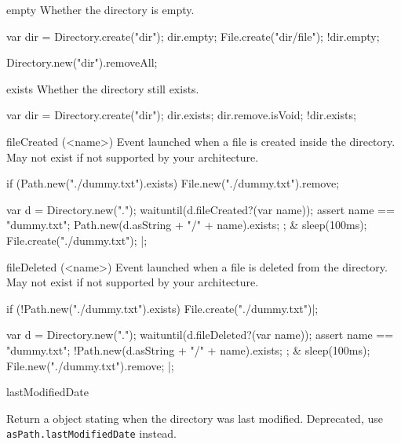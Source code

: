 \begin{urbiscriptapi}
\item[empty]
  Whether the directory is empty.
\begin{urbiassert}
var dir = Directory.create("dir");
dir.empty;
File.create("dir/file");
!dir.empty;
\end{urbiassert}
\begin{urbicomment}
Directory.new("dir").removeAll;
\end{urbicomment}


\item[exists]
  Whether the directory still exists.
\begin{urbiassert}
var dir = Directory.create("dir");
dir.exists;
dir.remove.isVoid;
!dir.exists;
\end{urbiassert}


\item[fileCreated](<name>)%
  Event launched when a file is created inside the directory.
  May not exist if not supported by your architecture.

\begin{urbiscript}[firstnumber=1]
if (Path.new("./dummy.txt").exists)
  File.new("./dummy.txt").remove;

  {
    var d = Directory.new(".");
    waituntil(d.fileCreated?(var name));
    assert
    {
      name == "dummy.txt";
      Path.new(d.asString + "/" + name).exists;
    };
  }
&
  {
    sleep(100ms);
    File.create("./dummy.txt");
  }|;
\end{urbiscript}


\item[fileDeleted](<name>)%
  Event launched when a file is deleted from the directory.  May not exist
  if not supported by your architecture.
\begin{urbiscript}[firstnumber=1]
if (!Path.new("./dummy.txt").exists)
  File.create("./dummy.txt")|;

  {
    var d = Directory.new(".");
    waituntil(d.fileDeleted?(var name));
    assert
    {
      name == "dummy.txt";
      !Path.new(d.asString + "/" + name).exists;
    };
  }
&
  {
    sleep(100ms);
    File.new("./dummy.txt").remove;
  }|;
\end{urbiscript}


\item[lastModifiedDate]
  \experimental{}

  Return a  object stating when the directory was last
  modified.  Deprecated, use
  \lstinline|asPath.lastModifiedDate| instead.



\end{urbiscriptapi}
